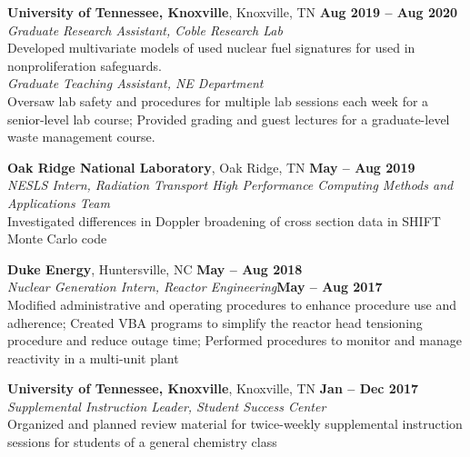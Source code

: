 \documentclass[margin,line]{resume}
\begin{document}
\begin{resume}
    \textbf{University of Tennessee, Knoxville}, Knoxville, TN \hfill \textbf{Aug 2019 -- Aug 2020}\vspace{1mm}\\
                \textsl{Graduate Research Assistant, Coble Research Lab} \\ 
                Developed multivariate models of used nuclear fuel signatures for 
                used in nonproliferation safeguards.\vspace{2mm}\\
                \textsl{Graduate Teaching Assistant, NE Department}\\
                Oversaw lab safety and procedures for multiple lab sessions each week for 
                a senior-level lab course; Provided grading and guest lectures for 
                a graduate-level waste management course. 
                

    \textbf{Oak Ridge National Laboratory}, Oak Ridge, TN \hfill \textbf{May -- Aug 2019}\vspace{1mm}\\
                \textsl{NESLS Intern, Radiation Transport High Performance Computing Methods and Applications Team}\\
                Investigated differences in Doppler broadening of cross section data in SHIFT Monte Carlo code

    \textbf{Duke Energy}, Huntersville, NC \hfill \textbf{May -- Aug 2018}\\
                \textsl{Nuclear Generation Intern, Reactor Engineering}\hfill \textbf{May -- Aug 2017}\vspace{1mm}\\
                Modified administrative and operating procedures to enhance procedure use and adherence;
                Created VBA programs to simplify the reactor head tensioning procedure and reduce outage time;
                Performed procedures to monitor and manage reactivity in a multi-unit plant 

    \textbf{University of Tennessee, Knoxville}, Knoxville, TN \hfill \textbf{Jan -- Dec 2017}\vspace{1mm}\\
                \textsl{Supplemental Instruction Leader, Student Success Center}\\
                Organized and planned review material for twice-weekly supplemental instruction sessions 
                for students of a general chemistry class
    

\end{resume}
\end{document}
